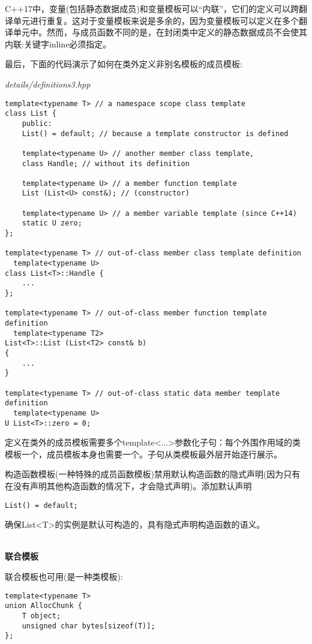 C++17中，变量(包括静态数据成员)和变量模板可以“内联”，它们的定义可以跨翻译单元进行重复。这对于变量模板来说是多余的，因为变量模板可以定义在多个翻译单元中。然而，与成员函数不同的是，在封闭类中定义的静态数据成员不会使其内联:关键字inline必须指定。

最后，下面的代码演示了如何在类外定义非别名模板的成员模板:

\noindent
\textit{details/definitions3.hpp}
\begin{lstlisting}[style=styleCXX]
template<typename T> // a namespace scope class template
class List {
	public:
	List() = default; // because a template constructor is defined
	
	template<typename U> // another member class template,
	class Handle; // without its definition
	
	template<typename U> // a member function template
	List (List<U> const&); // (constructor)
	
	template<typename U> // a member variable template (since C++14)
	static U zero;
};

template<typename T> // out-of-class member class template definition
  template<typename U>
class List<T>::Handle {
	...
};

template<typename T> // out-of-class member function template definition
  template<typename T2>
List<T>::List (List<T2> const& b)
{
	...
}

template<typename T> // out-of-class static data member template definition
  template<typename U>
U List<T>::zero = 0;
\end{lstlisting}

定义在类外的成员模板需要多个template<...>参数化子句：每个外围作用域的类模板一个，成员模板本身也需要一个。子句从类模板最外层开始逐行展示。

构造函数模板(一种特殊的成员函数模板)禁用默认构造函数的隐式声明(因为只有在没有声明其他构造函数的情况下，才会隐式声明)。添加默认声明

\begin{lstlisting}[style=styleCXX]
List() = default;
\end{lstlisting}

确保List<T>的实例是默认可构造的，具有隐式声明构造函数的语义。

\hspace*{\fill} \\ %
\noindent
\textbf{联合模板}

联合模板也可用(是一种类模板):

\begin{lstlisting}[style=styleCXX]
template<typename T>
union AllocChunk {
	T object;
	unsigned char bytes[sizeof(T)];
};
\end{lstlisting}

